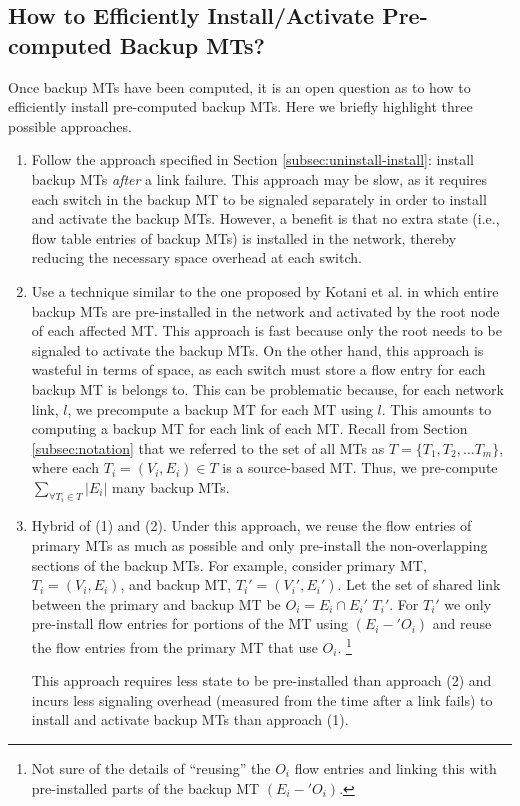 \subsection{How to Efficiently Install/Activate Pre-computed Backup MTs?}

Once backup MTs have been computed, it is an open question as to how to efficiently install pre-computed backup MTs.  Here we briefly highlight three possible approaches.
\begin{enumerate}
	\item Follow the approach specified in Section \ref{subsec:uninstall-install}: install backup MTs \emph{after} a link failure.  This approach may be slow, as it requires each 
switch in the backup MT to be signaled separately in order to install and activate the backup MTs.  However, a benefit is that no extra state (i.e., flow table entries of backup MTs) is 
installed in the network, thereby reducing the necessary space overhead at each switch.

	\item Use a technique similar to the one proposed by Kotani et al. \cite{Kotani12} in which entire backup MTs are pre-installed in the network and activated by the root node of each 
affected MT.  This approach is fast because only the root needs to be signaled to activate the backup MTs.  On the other hand, this approach is wasteful in terms of space, as each 
switch must store a flow entry for each backup MT is belongs to.  This can be problematic because, for each network link, $l$, we precompute a backup MT for each MT using $l$.  This amounts
to computing a backup MT for each link of each MT.   Recall from Section \ref{subsec:notation} that we referred to the set of all MTs as $T = \{T_1,T_2, \dots T_m\}$, 
where each $T_i = (V_i,E_i) \in T$ is a source-based MT.  Thus, we pre-compute $\displaystyle \sum_{\forall T_i \in T} {|E_i|}$ many backup MTs. 

	\item Hybrid of (1) and (2).  Under this approach, we reuse the flow entries of primary MTs as much as possible and only pre-install the non-overlapping sections of the backup MTs.  
For example, consider primary MT, $T_i = (V_i,E_i)$, and backup MT, $T_i'=(V_i',E_i')$.  Let the set of shared link between the primary and backup MT be $O_i = E_i \cap E_i'$ $T_i'$. For $T_i'$
we only pre-install flow entries for portions of the MT using $(E_i-'O_i)$ and reuse the flow entries from the primary MT that use $O_i$.  
\footnote{Not sure of the details of ``reusing'' the $O_i$ flow entries and linking this with pre-installed parts of the backup MT  $(E_i-'O_i)$. }

	This approach requires less state to be pre-installed than approach (2) and incurs less signaling overhead (measured from the time after a link fails) to install and activate
backup MTs than approach (1).
\end{enumerate}

